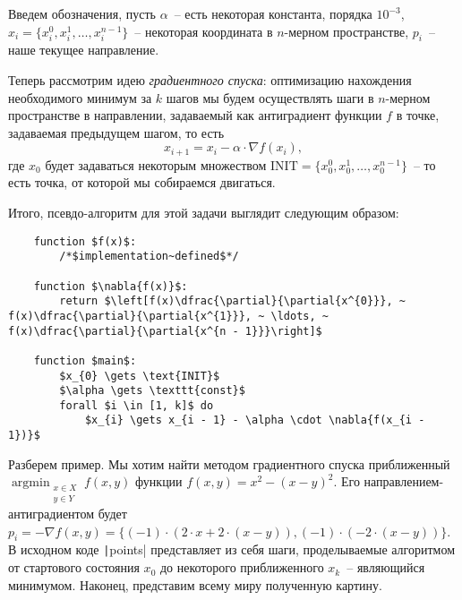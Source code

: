 \documentclass[12pt, a4paper, oneside]{article}
\begin{document}
	Введем обозначения, пусть $\alpha$~-- есть некоторая константа, порядка $10^{-3}$, $x_{i} = \{x^{0}_{i}, x^{1}_{i}, \ldots, x^{n - 1}_{i}\}$~-- некоторая координата в $n$-мерном пространстве, $p_{i}$~-- наше текущее направление.

	Теперь рассмотрим идею \textit{градиентного спуска}: оптимизацию нахождения необходимого минимум за $k$ шагов мы будем осуществлять шаги в $n$-мерном пространстве в направлении, задаваемый как антиградиент функции $f$ в точке, задаваемая предыдущем шагом, то есть
	\[
		x_{i + 1} = x_{i} - \alpha \cdot \nabla{f(x_{i})},
	\] где $x_{0}$ будет задаваться некоторым множеством $\text{INIT} = \{x^{0}_{0}, x^{1}_{0}, \ldots, x^{n - 1}_{0}\}$~-- то есть точка, от которой мы собираемся двигаться.

	Итого, псевдо-алгоритм для этой задачи выглядит следующим образом:
	\begin{lstlisting}
	function $f(x)$:
		/*$implementation~defined$*/
	
	function $\nabla{f(x)}$:
		return $\left[f(x)\dfrac{\partial}{\partial{x^{0}}}, ~ f(x)\dfrac{\partial}{\partial{x^{1}}}, ~ \ldots, ~ f(x)\dfrac{\partial}{\partial{x^{n - 1}}}\right]$
	
	function $main$:
		$x_{0} \gets \text{INIT}$
		$\alpha \gets \texttt{const}$
		forall $i \in [1, k]$ do
			$x_{i} \gets x_{i - 1} - \alpha \cdot \nabla{f(x_{i - 1})}$
	\end{lstlisting}
	Разберем пример. Мы хотим найти методом градиентного спуска приближенный $\operatorname*{argmin}_{\substack{x \in X  \\ y \in Y}}{f(x, y)}$ функции $f(x, y) = x^{2} - (x - y)^{2}$. Его направлением-антиградиентом будет $p_{i} = -\nabla{f(x, y)} = \{(-1) \cdot (2 \cdot x + 2 \cdot (x - y)), (-1) \cdot (-2 \cdot (x - y))\}$. 
	В исходном коде \texttt|points| представляет из себя шаги, проделываемые алгоритмом от стартового состояния $x_{0}$ до некоторого приближенного $x_{k}$~-- являющийся минимумом. Наконец, представим всему миру полученную картину.
	\begin{flushleft}
		
	\end{flushleft}
\end{document}
